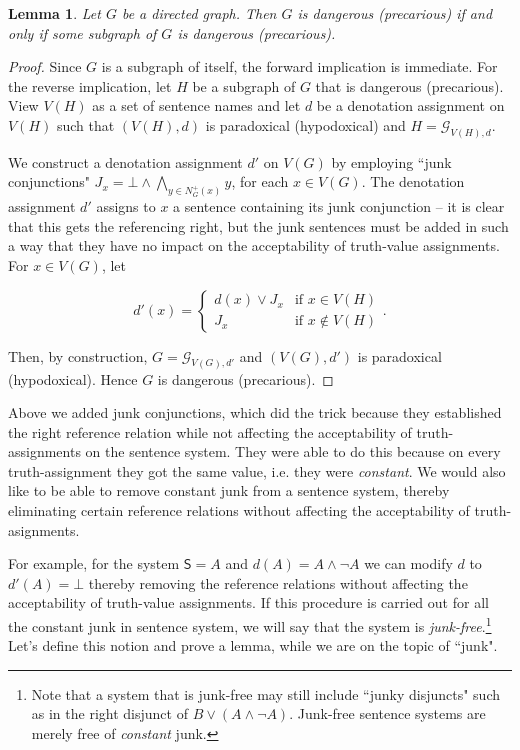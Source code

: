 \documentclass[12pt]{article}
\newtheorem{lem}[thm]{Lemma}
\theoremstyle{remark}
\newcommand{\prg}{\hspace{0.25in}}
\newcommand{\fancy}[1]{\mathcal{#1}}
\def\S{\textsf{S}}
\def\G{\fancy{G}}
\begin{document}
\begin{lem}\label{SubgraphDangerLemma}
Let $G$ be a directed graph.  Then $G$ is dangerous (precarious) if and only if some subgraph of $G$ is dangerous (precarious).
\end{lem}
\begin{proof}
Since $G$ is a subgraph of itself, the forward implication is immediate.  For the reverse implication, let $H$ be a subgraph of $G$ that is dangerous (precarious).  View $V(H)$ as a set of sentence names and let $d$ be a denotation assignment on $V(H)$ such that $(V(H), d)$ is paradoxical (hypodoxical) and
$H = \G_{V(H), d}$. \newline 

We construct a denotation assignment $d'$ on $V(G)$ by employing ``junk conjunctions" $J_x = \bot \wedge \bigwedge_{y \in N^{+}_G(x)} y$, for each $x \in V(G)$. The denotation assignment $d'$ assigns to $x$ a sentence containing its junk conjunction -- it is clear that this gets the referencing right, but the junk sentences must be added in such a way that they have no impact on the acceptability of truth-value assignments. For $x \in V(G)$, let

\[d'(x) = \begin{cases}
d(x) \vee J_x & \text{if } x \in V(H) \\
J_x & \text{if } x \not \in V(H)
\end{cases}.\]

Then, by construction, $G = \G_{V(G), d'}$ and $(V(G), d')$ is paradoxical (hypodoxical).  Hence $G$ is dangerous (precarious).
\end{proof}

Above we added junk conjunctions, which did the trick because they established the right reference relation while not affecting the acceptability of truth-assignments on the sentence system. They were able to do this because on every truth-assignment they got the same value, i.e. they were \textit{constant}.  We would also like to be able to remove constant junk from a sentence system, thereby eliminating certain reference relations without affecting the acceptability of truth-asignments. 

\prg For example, for the system $\S = {A}$ and $d(A) = A \wedge\neg A$ we can modify $d$ to $d'(A) = \bot$ thereby removing the reference relations without affecting the acceptability of truth-value assignments. If this procedure is carried out for all the constant junk in sentence system, we will say that the system is \textit{junk-free}.\footnote{Note that a system that is junk-free may still include ``junky disjuncts" such as in the right disjunct of $B \vee (A \wedge\neg A)$. Junk-free sentence systems are merely free of \textit{constant} junk.}  Let's define this notion and prove a lemma, while we are on the topic of ``junk".
\end{document}
